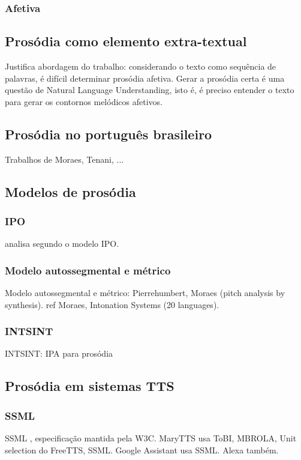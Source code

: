 \subsubsection{Afetiva}
\subsection{Prosódia como elemento extra-textual}
Justifica abordagem do trabalho: considerando o texto como sequência de
palavras, é difícil determinar prosódia afetiva. Gerar a prosódia certa é uma
questão de Natural Language Understanding, isto é, é preciso entender o texto
para gerar os contornos melódicos afetivos.
\subsection{Prosódia no português brasileiro}
Trabalhos de Moraes, Tenani, ...
\subsection{Modelos de prosódia}
\subsubsection{IPO}
\cite{ipo} analisa segundo o modelo IPO.
\subsubsection{Modelo autossegmental e métrico}
Modelo autossegmental e métrico: Pierrehumbert, Moraes (pitch analysis by synthesis).
ref Moraes, Intonation Systems (20 languages).
\subsubsection{INTSINT}
INTSINT: IPA para prosódia
\subsection{Prosódia em sistemas TTS}
\subsubsection{SSML}
SSML \cite{SSML}, especificação mantida pela W3C.
MaryTTS usa ToBI, MBROLA, Unit selection do FreeTTS, SSML.
Google Assistant usa SSML. Alexa também.

